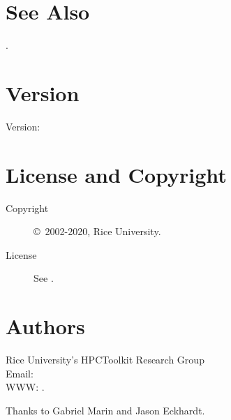 \documentclass[english]{article}
\begin{document}



\section{See Also}

.

\section{Version}

Version: \Version

\section{License and Copyright}

\begin{description}
\item[Copyright] \copyright\ 2002-2020, Rice University.
\item[License] See .
\end{description}

\section{Authors}

\noindent
Rice University's HPCToolkit Research Group \\
Email:  \\
WWW: .

Thanks to Gabriel Marin and Jason Eckhardt.

\LatexManEnd
\end{document}
